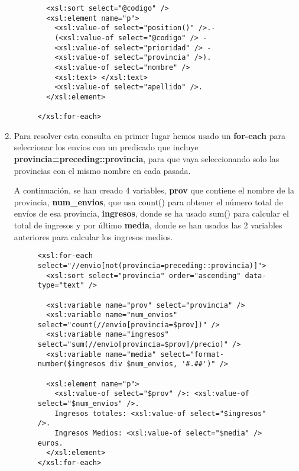 \begin{enumerate}[label=\Alph*.]
\begin{figure}[H]
\begin{tcolorbox}[sharp corners, colback=yellow!30, colframe=white!20]
\begin{verbatim}
  <xsl:sort select="@codigo" />
  <xsl:element name="p">
    <xsl:value-of select="position()" />.-
    (<xsl:value-of select="@codigo" /> -
    <xsl:value-of select="prioridad" /> -
    <xsl:value-of select="provincia" />).
    <xsl:value-of select="nombre" />
    <xsl:text> </xsl:text>
    <xsl:value-of select="apellido" />.
  </xsl:element>

</xsl:for-each>
\end{verbatim}
        \end{tcolorbox}
    \end{figure}

    \item Para resolver esta consulta en primer lugar hemos usado un \textbf{for-each}
    para seleccionar los envios con un predicado que incluye \textbf{provincia=preceding::provincia},
    para que vaya seleccionando solo las provincias con el mismo nombre en cada pasada.

    A continuación, se han creado 4 variables, \textbf{prov} que contiene el nombre de la provincia,
    \textbf{num\_envios}, que usa count() para obtener el número total de envíos de esa provincia,
    \textbf{ingresos}, donde se ha usado sum() para calcular el total de ingresos y por último
    \textbf{media}, donde se han usados las 2 variables anteriores para calcular los ingresos medios.

    \begin{figure}[H]
        \begin{tcolorbox}[sharp corners, colback=yellow!30, colframe=white!20]
            \scriptsize
\begin{verbatim}
<xsl:for-each select="//envio[not(provincia=preceding::provincia)]">
  <xsl:sort select="provincia" order="ascending" data-type="text" />

  <xsl:variable name="prov" select="provincia" />
  <xsl:variable name="num_envios" select="count(//envio[provincia=$prov])" />
  <xsl:variable name="ingresos" select="sum(//envio[provincia=$prov]/precio)" />
  <xsl:variable name="media" select="format-number($ingresos div $num_envios, '#.##')" />

  <xsl:element name="p">
    <xsl:value-of select="$prov" />: <xsl:value-of select="$num_envios" />.
    Ingresos totales: <xsl:value-of select="$ingresos" />.
    Ingresos Medios: <xsl:value-of select="$media" /> euros.
  </xsl:element>
</xsl:for-each>
\end{verbatim}
        \end{tcolorbox}
    \end{figure}


\end{enumerate}
